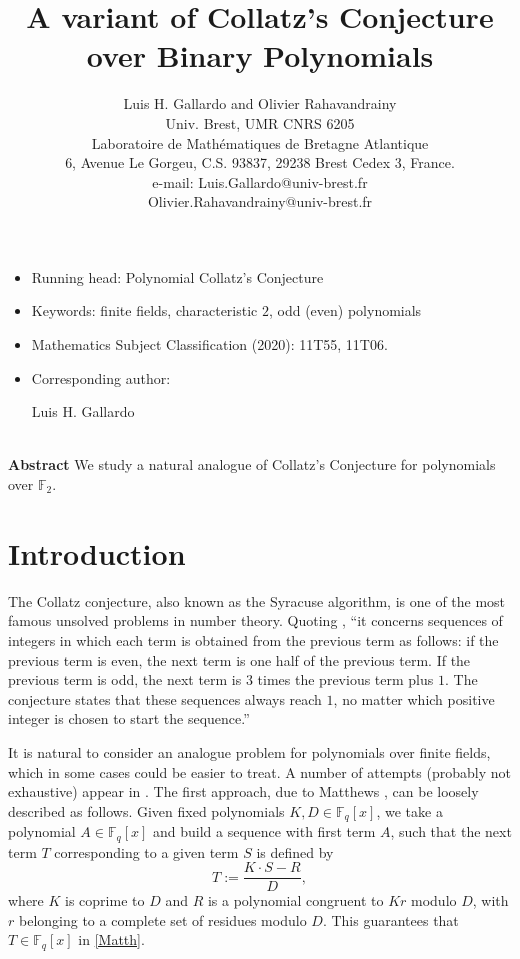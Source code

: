 \documentclass [12pt]{article}
\begin{document}
\title{A variant of Collatz's Conjecture over Binary Polynomials}
\author{ Luis H. Gallardo  and Olivier Rahavandrainy\\
Univ. Brest, UMR CNRS 6205\\
Laboratoire de Math\'ematiques de Bretagne Atlantique\\
6, Avenue Le Gorgeu, C.S. 93837, 29238 Brest Cedex 3, France.\\
e-mail: Luis.Gallardo@univ-brest.fr \\
Olivier.Rahavandrainy@univ-brest.fr}
\maketitle

\begin{itemize}
\item[a)]
Running head: Polynomial Collatz's Conjecture
\item[b)]
Keywords: finite fields,
characteristic $2$,  odd (even) polynomials
\item[c)]
Mathematics Subject Classification (2020): 11T55, 11T06.
\item[d)]
Corresponding author:
\begin{center} Luis H. Gallardo
\end{center}
\end{itemize}
\newpage~\\
{\bf{Abstract}}
We study a natural analogue of Collatz's Conjecture for polynomials over $\mathbb{F}_2$.
{\section{Introduction}}


The Collatz conjecture, also known as the Syracuse algorithm, is one of the most famous unsolved problems in number theory. Quoting \cite{ref-wiki}, ``it concerns sequences of integers in which each term is obtained from the previous term as follows: if the previous term is even, the next term is one half of the previous term. If the previous term is odd, the next term is $3$ times the previous term plus $1$. The conjecture states that these sequences always reach $1$, no matter which positive integer is chosen to start the sequence.''

It is natural to consider an analogue problem for polynomials over finite fields, which in some cases could be easier to treat. A number of attempts (probably not exhaustive) appear in \cite{Paran2023,Alon,Paran2025,Yucas,Matthews}. The first approach, due to Matthews \cite{Matthews}, can be loosely described as follows. Given fixed polynomials $K,D \in \mathbb{F}_q[x]$, we take a polynomial $A \in \mathbb{F}_q[x]$ and build a sequence with first term $A$, such that the next term $T$ corresponding to a given term $S$ is defined by
\begin{equation}\label{Matth}
T := \frac{K \cdot S - R}{D},
\end{equation}
where $K$ is coprime to $D$ and $R$ is a polynomial congruent to $Kr$ modulo $D$, with $r$ belonging to a complete set of residues modulo $D$. This guarantees that $T \in \mathbb{F}_q[x]$ in \eqref{Matth}.
\end{document}
